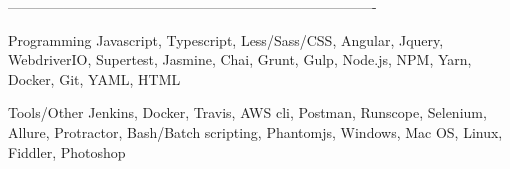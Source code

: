 -------------------------------------------------------------------------------


\begin{cvskills}

  \cvskill
    {Programming} %
    {Javascript, Typescript, Less/Sass/CSS, Angular, Jquery, WebdriverIO, Supertest, Jasmine, Chai, Grunt, Gulp, Node.js, NPM, Yarn, Docker, Git, YAML, HTML} %

  \cvskill
    {Tools/Other} %
    {Jenkins, Docker, Travis, AWS cli, Postman, Runscope, Selenium, Allure, Protractor, Bash/Batch scripting, Phantomjs, Windows, Mac OS, Linux, Fiddler, Photoshop} %

\end{cvskills}
